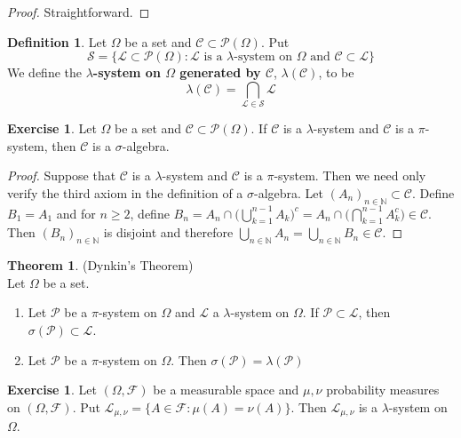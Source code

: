 \documentclass[12pt]{amsart}
\theoremstyle{definition}
\newtheorem{defn}[definition]{Definition}
\newtheorem{thm}[definition]{Theorem}
\newtheorem{ex}[definition]{Exercise}
\newcommand{\lam}{\lambda}
\newcommand{\sig}{\sigma}
\newcommand{\Om}{\Omega}
\newcommand{\N}{\mathbb{N}}
\newcommand{\MC}{\mathcal{C}}
\newcommand{\MF}{\mathcal{F}}
\newcommand{\ML}{\mathcal{L}}
\newcommand{\MS}{\mathcal{S}}
\newcommand{\MP}{\mathcal{P}}
\begin{document}
	\begin{proof}
		Straightforward.
	\end{proof}
	
	\begin{defn}
		Let $\Om$ be a set and $\MC \subset \MP(\Om)$. Put $$\MS = \{\ML \subset \MP(\Om): \ML \text{ is a }\lam\text{-system on }\Om \text{ and } \MC \subset \ML\}$$ We define the \textbf{$\lam$-system on $\Om$ generated by $\MC$}, $\lam(\MC)$, to be $$\lam(\MC) = \bigcap_{\ML \in \MS}\ML$$
	\end{defn}
	
	\begin{ex}
		Let $\Om$ be a set and $\MC \subset \MP(\Om)$. If $\MC$ is a $\lam$-system and $\MC$ is a $\pi$-system, then $\MC$ is a $\sig$-algebra.
	\end{ex}
	
	\begin{proof}
		Suppose that $\MC$ is a $\lam$-system and $\MC$ is a $\pi$-system. Then we need only verify the third axiom in the definition of a $\sig$-algebra. Let $(A_n)_{n \in \N} \subset \MC$. Define $B_1 = A_1$ and for $n \geq 2$, define $B_n = A_n \cap \bigg( \bigcup\limits_{k=1}^{n-1}A_k \bigg)^c = A_n \cap \bigg( \bigcap\limits_{k=1}^{n-1}A_k^c \bigg) \in \MC$. Then $(B_n)_{n \in \N}$ is disjoint and therefore $\bigcup\limits_{n \in \N}A_n = \bigcup\limits_{n \in \N}B_n \in \MC$.
	\end{proof}
	
	\begin{thm}(Dynkin's Theorem) \\
		Let $\Om$ be a set.
		\begin{enumerate}
			\item Let $\MP$ be a $\pi$-system on $\Om$ and $\ML$ a $\lam$-system on $\Om$. If $\MP \subset \ML$, then $\sig(\MP) \subset \ML$.
			\item Let $\MP$ be a $\pi$-system on $\Om$. Then $\sig(\MP) = \lam(\MP)$
		\end{enumerate} 
		
	\end{thm}
	
	\begin{ex}
		Let $(\Om, \MF)$ be a measurable space and $\mu, \nu$ probability measures on $(\Om, \MF)$. Put $\ML_{\mu,\nu} = \{A \in \MF: \mu(A) = \nu(A)\}$. Then $\ML_{\mu, \nu}$ is a $\lam$-system on $\Om$.
	\end{ex}
	
\end{document}
